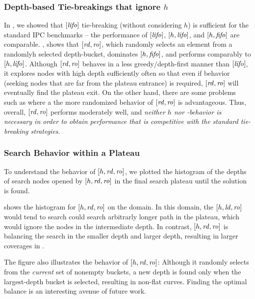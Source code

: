 \subsubsection{Depth-based Tie-breakings that ignore $h$}

In , we showed that $[\mbox{\textit{lifo}}]$ tie-breaking (without considering $h$) is
sufficient for the standard IPC benchmarks -- the performance of $[\mbox{\textit{lifo}}]$, $[h,\mbox{\textit{lifo}}]$, and $[h,\mbox{\textit{fifo}}]$ are comparable.
, shows that $[\mbox{\textit{rd}},\mbox{\textit{ro}}]$, which randomly selects an element from a randomlyh selected depth-bucket, dominates $[h,\mbox{\textit{fifo}}]$,
and performs comparably to $[h,\mbox{\textit{lifo}}]$.
Although $[\mbox{\textit{rd}},\mbox{\textit{ro}}]$ behaves in a less greedy/depth-first manner than $[\mbox{\textit{lifo}}]$, 
it explores nodes with high depth sufficiently often so that even if \lifo behavior (seeking nodes that are far from the plateau entrance) is required, $[\mbox{\textit{rd}},\mbox{\textit{ro}}]$ will eventually find the plateau exit.
On the other hand, there are some problems such as  where a the more randomized behavior of $[\mbox{\textit{rd}},\mbox{\textit{ro}}]$ is advantageous.
Thus, overall, $[\mbox{\textit{rd}},\mbox{\textit{ro}}]$ performs moderately well, and 
\emph{neither $h$ nor \lifo-behavior is necessary in order to obtain performance that is competitive with the standard
tie-breaking strategies}.




\subsubsection{Search Behavior within a Plateau}

To understand the behavior of $[h,\mbox{\textit{rd}},\mbox{\textit{ro}}]$, we plotted the histogram of
the depths of search nodes opened by $[h,\mbox{\textit{rd}},\mbox{\textit{ro}}]$ in the final search
plateau until the solution is found.

 shows the histogram 
for $[h,\mbox{\textit{rd}},\mbox{\textit{ro}}]$ %
on the  domain.
% 
In this domain, the $[h,\mbox{\textit{ld}},\mbox{\textit{ro}}]$ would tend to search could search arbitrarly longer path in the
plateau, which would ignore the nodes in the intermediate depth.
In contrast, $[h,\mbox{\textit{rd}},\mbox{\textit{ro}}]$ is balancing the search in the smaller depth and larger
depth, resulting in larger coverages in .

The figure also illustrates the behavior of $[h,\mbox{\textit{rd}},\mbox{\textit{ro}}]$: Although it
randomly selects from the \emph{current} set of nonempty buckets,
a new depth is found only when the largest-depth bucket is selected,
resulting in non-flat curves.
Finding the optimal balance is an interesting avenue of
future work.

